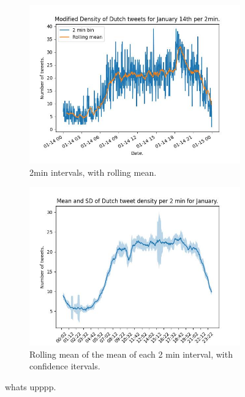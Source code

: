 \documentclass[9pt]{article}
\begin{document}
\begin{figure}[h!]
    \center
    \begin{subfigure}[b]{0.45\textwidth}
        \includegraphics[scale=0.3]{figures/JanNLD14roll.jpeg}
        \caption{2min intervals, with rolling mean.} 
        \label{fig:2a}
    \end{subfigure}
    \begin{subfigure}[b]{0.45\textwidth}
        \includegraphics[scale=0.3]{figures/JanNLdayfill.jpeg}
        \caption{Rolling mean of the mean of each 2 min interval, with confidence itervals.} 
        \label{fig:2b}
    \end{subfigure}
    \caption{whats upppp.}
    \label{fig:2g}
\end{figure}
\end{document}
